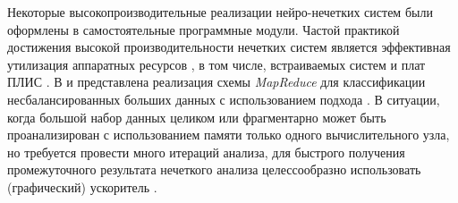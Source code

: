 Некоторые высокопроизводительные реализации нейро-нечетких систем были оформлены в самостоятельные программные модули. Частой практикой достижения высокой производительности нечетких систем является эффективная утилизация аппаратных ресурсов \cite{FuzzyLite}, в том числе, встраиваемых систем и плат ПЛИС \cite{Aldair2018}. В \cite{Lopez2015} и \cite{Elkano2017} представлена реализация схемы \textit{MapReduce} для классификации несбалансированных больших данных с использованием подхода \cite{Chi1996}. В ситуации, когда большой набор данных целиком или фрагментарно может быть проанализирован с использованием памяти только одного вычислительного узла, но требуется провести много итераций анализа, для быстрого получения промежуточного результата нечеткого анализа целессообразно использовать (графический) ускоритель \cite{}.






